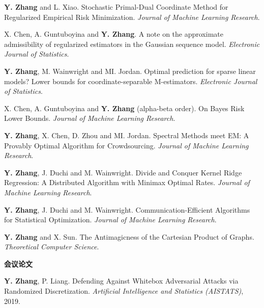 \documentclass{res}
\begin{document}
\begin{resume}
\begin{enumerate}[label={[J\arabic*]}, ref={J\arabic*}]
\item \textbf{Y. Zhang} and L. Xiao. Stochastic Primal-Dual Coordinate Method for Regularized Empirical Risk Minimization.
\emph{Journal of Machine Learning Research}.\label{stochastic-jmlr}

\item X. Chen, A. Guntuboyina and \textbf{Y. Zhang}. A note on the approximate admissibility of regularized estimators in the Gaussian sequence model.
\emph{Electronic Journal of Statistics}.\label{a-note-ejs}

\item \textbf{Y. Zhang}, M. Wainwright and MI. Jordan. Optimal prediction for sparse linear models? Lower bounds for coordinate-separable M-estimators.\label{optimality-ejs}
\emph{Electronic Journal of Statistics}.

\item X. Chen, A. Guntuboyina and \textbf{Y. Zhang} (alpha-beta order). On Bayes Risk Lower Bounds.
\emph{Journal of Machine Learning Research}.\label{on-bayes-jmlr}

\item \textbf{Y. Zhang}, X. Chen, D. Zhou and MI. Jordan. Spectral Methods meet EM: A Provably Optimal Algorithm for Crowdsourcing.
\emph{Journal of Machine Learning Research}.\label{spectral-jmlr}

\item \textbf{Y. Zhang}, J. Duchi and M. Wainwright. Divide and Conquer Kernel Ridge Regression: A Distributed Algorithm with Minimax Optimal Rates.
\emph{Journal of Machine Learning Research}.\label{divide-jmlr}

\item \textbf{Y. Zhang}, J. Duchi and M. Wainwright. Communication-Efficient Algorithms for Statistical Optimization.
\emph{Journal of Machine Learning Research}.\label{communication-jmlr}

\item \textbf{Y. Zhang} and X. Sun. The Antimagicness of the Cartesian Product of Graphs.
\emph{Theoretical Computer Science}.\label{the-antimagicness-tcs}
\end{enumerate}

{\bf\Large 会议论文}
\vspace{5pt}

\begin{enumerate}[label={[C\arabic*]}, ref={C\arabic*}]

\item  \textbf{Y. Zhang}, P. Liang. Defending Against Whitebox Adversarial Attacks via Randomized Discretization.
\emph{Artificial Intelligence and Statistics (AISTATS)}, 2019. \label{defending-aistats17}


\end{enumerate}
\end{resume}
\end{document}
